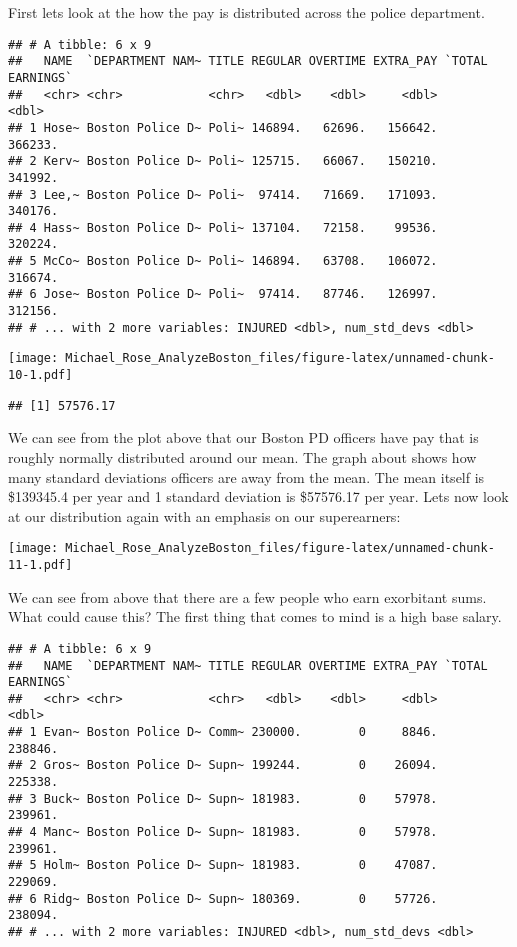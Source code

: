 \documentclass[]{article}
\begin{document}
First lets look at the how the pay is distributed across the police
department.

\begin{verbatim}
## # A tibble: 6 x 9
##   NAME  `DEPARTMENT NAM~ TITLE REGULAR OVERTIME EXTRA_PAY `TOTAL EARNINGS`
##   <chr> <chr>            <chr>   <dbl>    <dbl>     <dbl>            <dbl>
## 1 Hose~ Boston Police D~ Poli~ 146894.   62696.   156642.          366233.
## 2 Kerv~ Boston Police D~ Poli~ 125715.   66067.   150210.          341992.
## 3 Lee,~ Boston Police D~ Poli~  97414.   71669.   171093.          340176.
## 4 Hass~ Boston Police D~ Poli~ 137104.   72158.    99536.          320224.
## 5 McCo~ Boston Police D~ Poli~ 146894.   63708.   106072.          316674.
## 6 Jose~ Boston Police D~ Poli~  97414.   87746.   126997.          312156.
## # ... with 2 more variables: INJURED <dbl>, num_std_devs <dbl>
\end{verbatim}

\texttt{[image: Michael\_Rose\_AnalyzeBoston\_files/figure-latex/unnamed-chunk-10-1.pdf]}

\begin{verbatim}
## [1] 57576.17
\end{verbatim}

We can see from the plot above that our Boston PD officers have pay that
is roughly normally distributed around our mean. The graph about shows
how many standard deviations officers are away from the mean. The mean
itself is \$139345.4 per year and 1 standard deviation is \$57576.17 per
year. Lets now look at our distribution again with an emphasis on our
superearners:

\texttt{[image: Michael\_Rose\_AnalyzeBoston\_files/figure-latex/unnamed-chunk-11-1.pdf]}

We can see from above that there are a few people who earn exorbitant
sums. What could cause this? The first thing that comes to mind is a
high base salary.

\begin{verbatim}
## # A tibble: 6 x 9
##   NAME  `DEPARTMENT NAM~ TITLE REGULAR OVERTIME EXTRA_PAY `TOTAL EARNINGS`
##   <chr> <chr>            <chr>   <dbl>    <dbl>     <dbl>            <dbl>
## 1 Evan~ Boston Police D~ Comm~ 230000.        0     8846.          238846.
## 2 Gros~ Boston Police D~ Supn~ 199244.        0    26094.          225338.
## 3 Buck~ Boston Police D~ Supn~ 181983.        0    57978.          239961.
## 4 Manc~ Boston Police D~ Supn~ 181983.        0    57978.          239961.
## 5 Holm~ Boston Police D~ Supn~ 181983.        0    47087.          229069.
## 6 Ridg~ Boston Police D~ Supn~ 180369.        0    57726.          238094.
## # ... with 2 more variables: INJURED <dbl>, num_std_devs <dbl>
\end{verbatim}
\end{document}

